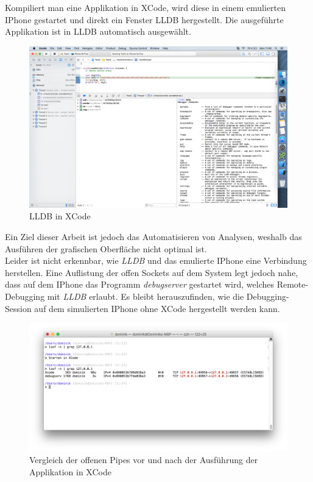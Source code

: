  Kompiliert man eine Applikation in XCode, wird diese in einem emulierten IPhone gestartet und direkt ein Fenster LLDB hergestellt. Die ausgeführte Applikation ist in LLDB automatisch ausgewählt.\\

\begin{figure}[htbp]
	\centering
	\includegraphics[width=\textwidth]{bilder/pentest_mobile_anwendungen/vergleich_aktuelle_situation/20160627_XCode-LLDB.png}
	\caption{LLDB in XCode}
	\label{fig:LLDBinXCode}
\end{figure}
Ein Ziel dieser Arbeit ist jedoch das Automatisieren von Analysen, weshalb das Ausführen der grafischen Oberfläche nicht optimal ist.\\

Leider ist nicht erkennbar, wie \textit{LLDB} und das emulierte IPhone eine Verbindung herstellen. Eine Auflistung der offen Sockets auf dem System legt jedoch nahe, dass auf dem IPhone das Programm \textit{debugserver} gestartet wird, welches Remote-Debugging mit \textit{LLDB} erlaubt. Es bleibt herauszufinden, wie die Debugging-Session auf dem simulierten IPhone ohne XCode hergestellt werden kann.\\

\begin{figure}[htbp]
	\centering
	\includegraphics[width=\textwidth]{bilder/pentest_mobile_anwendungen/vergleich_aktuelle_situation/20160627_lsof_XCode_running.png}
	\caption{Vergleich der offenen Pipes vor und nach der Ausführung der Applikation in XCode}
	\label{fig:LSOFLLDB}
\end{figure}

